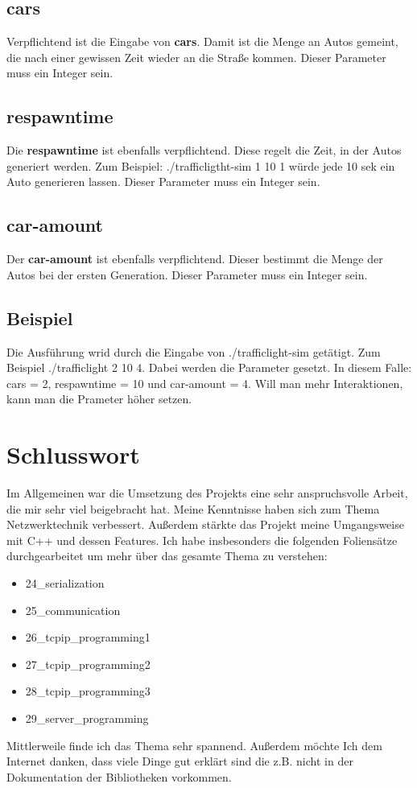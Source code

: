 \documentclass[12pt, oneside]{article}
\begin{document}
\subsection{cars}
Verpflichtend ist die Eingabe von \textbf{cars}. Damit ist die Menge an Autos gemeint, die nach einer gewissen Zeit wieder an die Straße kommen. Dieser Parameter muss ein Integer sein.

\subsection{respawntime}
Die \textbf{respawntime} ist ebenfalls verpflichtend. Diese regelt die Zeit, in der Autos generiert werden. Zum Beispiel: ./trafficligtht-sim 1 10 1 würde jede 10 sek ein Auto generieren lassen. Dieser Parameter muss ein Integer sein.

\subsection{car-amount}
Der \textbf{car-amount} ist ebenfalls verpflichtend. Dieser bestimmt die Menge der Autos bei der ersten Generation. Dieser Parameter muss ein Integer sein.

\subsection{Beispiel}
Die Ausführung wrid durch die Eingabe von ./trafficlight-sim getätigt. Zum Beispiel ./trafficlight 2 10 4. Dabei werden die Parameter gesetzt. In diesem Falle: cars = 2, respawntime = 10 und car-amount = 4.  Will man mehr Interaktionen, kann man die Prameter höher setzen. 

\section{Schlusswort}
Im Allgemeinen war die Umsetzung des Projekts eine sehr anspruchsvolle Arbeit, die mir sehr viel beigebracht hat. Meine Kenntnisse haben sich zum Thema Netzwerktechnik verbessert. Außerdem stärkte das Projekt meine Umgangsweise mit C++ und dessen Features. Ich habe insbesonders die folgenden Foliensätze durchgearbeitet um mehr über das gesamte Thema zu verstehen:
\begin{itemize}
    \item 24\_serialization
    \item 25\_communication
    \item 26\_tcpip\_programming1
    \item 27\_tcpip\_programming2
    \item 28\_tcpip\_programming3
    \item 29\_server\_programming
\end{itemize}
Mittlerweile finde ich das Thema sehr spannend. Außerdem möchte Ich dem Internet danken, dass viele Dinge gut erklärt sind die z.B. nicht in der Dokumentation der Bibliotheken vorkommen.


\newpage
\printbibliography
\end{document}

